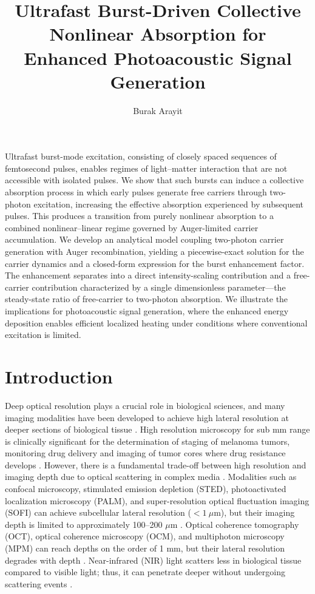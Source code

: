 \documentclass{optica-article}
\begin{document}
\title{Ultrafast Burst-Driven Collective Nonlinear Absorption for Enhanced Photoacoustic Signal Generation}

\author{Burak Arayit}

\address{Department, Institution, City, Country}


\begin{abstract*}
Ultrafast burst-mode excitation, consisting of closely spaced sequences of femtosecond pulses, enables regimes of light--matter interaction that are not accessible with isolated pulses. We show that such bursts can induce a collective absorption process in which early pulses generate free carriers through two-photon excitation, increasing the effective absorption experienced by subsequent pulses. This produces a transition from purely nonlinear absorption to a combined nonlinear--linear regime governed by Auger-limited carrier accumulation. We develop an analytical model coupling two-photon carrier generation with Auger recombination, yielding a piecewise-exact solution for the carrier dynamics and a closed-form expression for the burst enhancement factor. The enhancement separates into a direct intensity-scaling contribution and a free-carrier contribution characterized by a single dimensionless parameter---the steady-state ratio of free-carrier to two-photon absorption. We illustrate the implications for photoacoustic signal generation, where the enhanced energy deposition enables efficient localized heating under conditions where conventional excitation is limited.
\end{abstract*}

\section{Introduction}

Deep optical resolution plays a crucial role in biological sciences, and many imaging modalities have been developed to achieve high lateral resolution at deeper sections of biological tissue \cite{Yoon-2020}. High resolution microscopy for sub mm range is clinically significant for the determination of staging of melanoma tumors, monitoring drug delivery and imaging of tumor cores where drug resistance develops \cite{balch2009, aguirre2025,vakoc2009,minchinton2006}. However, there is a fundamental trade-off between high resolution and imaging depth due to optical scattering in complex media \cite{Yoon-2020}. Modalities such as confocal microscopy, stimulated emission depletion (STED), photoactivated localization microscopy (PALM), and super-resolution optical fluctuation imaging (SOFI) can achieve subcellular lateral resolution ($<1~\mu$m), but their imaging depth is limited to approximately 100--200 $\mu$m \cite{Yoon-2020}. Optical coherence tomography (OCT), optical coherence microscopy (OCM), and multiphoton microscopy (MPM) can reach depths on the order of 1 mm, but their lateral resolution degrades with depth \cite{Yoon-2020, Helmchen-2005}. Near-infrared (NIR) light scatters less in biological tissue compared to visible light; thus, it can penetrate deeper without undergoing scattering events \cite{Bashkatov-2005}.
\end{document}
